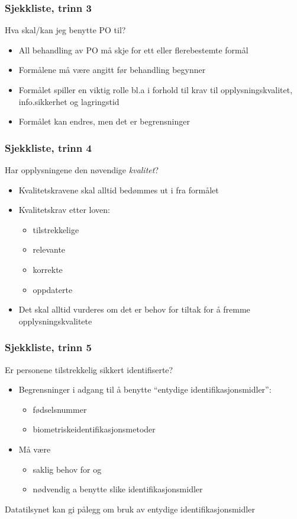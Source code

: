 \documentclass[11pt]{article}
\begin{document}
\subsubsection{Sjekkliste, trinn 3}
\label{sec-17.1.3}

    Hva skal/kan jeg benytte PO til? 
\begin{itemize}
\item All behandling av PO må skje for ett eller flerebestemte formål
\item Formålene må være angitt før behandling begynner
\item Formålet spiller en viktig rolle bl.a i forhold til krav til opplysningskvalitet, 
      info.sikkerhet og lagringstid
\item Formålet kan endres, men det er begrensninger
\end{itemize}
\subsubsection{Sjekkliste, trinn 4}
\label{sec-17.1.4}

    Har opplysningene den nøvendige \emph{kvalitet}? 
\begin{itemize}
\item Kvalitetskravene skal alltid bedømmes ut i fra formålet
\item Kvalitetskrav etter loven:

\begin{itemize}
\item tilstrekkelige
\item relevante
\item korrekte
\item oppdaterte
\end{itemize}

\item Det skal alltid vurderes om det er behov for tiltak for å fremme opplysningskvalitete
\end{itemize}
\subsubsection{Sjekkliste, trinn 5}
\label{sec-17.1.5}

    Er personene tilstrekkelig sikkert identifiserte?
\begin{itemize}
\item Begrensninger i adgang til å benytte “entydige identifikasjonsmidler”:

\begin{itemize}
\item fødselsnummer
\item biometriskeidentifikasjonsmetoder
\end{itemize}

\item Må være

\begin{itemize}
\item saklig behov for og
\item nødvendig a benytte slike identifikasjonsmidler
\end{itemize}

\end{itemize}
    Datatilsynet kan gi pålegg om bruk av entydige identifikasjonsmidler
\end{document}
